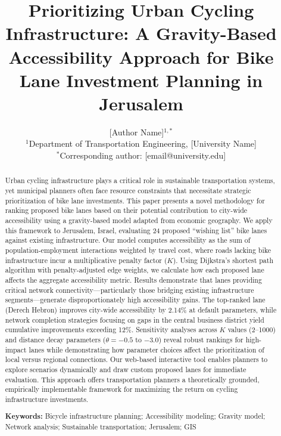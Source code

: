\documentclass[12pt,a4paper]{article}
\title{\textbf{Prioritizing Urban Cycling Infrastructure: A Gravity-Based Accessibility Approach for Bike Lane Investment Planning in Jerusalem}}
\author{
    [Author Name]$^{1,*}$ \\[0.5em]
    \small $^{1}$Department of Transportation Engineering, [University Name] \\
    \small $^{*}$Corresponding author: [email@university.edu]
}
\date{}
\begin{document}
\maketitle

\begin{abstract}
\noindent Urban cycling infrastructure plays a critical role in sustainable transportation systems, yet municipal planners often face resource constraints that necessitate strategic prioritization of bike lane investments. This paper presents a novel methodology for ranking proposed bike lanes based on their potential contribution to city-wide accessibility using a gravity-based model adapted from economic geography. We apply this framework to Jerusalem, Israel, evaluating 24 proposed ``wishing list'' bike lanes against existing infrastructure. Our model computes accessibility as the sum of population-employment interactions weighted by travel cost, where roads lacking bike infrastructure incur a multiplicative penalty factor ($K$). Using Dijkstra's shortest path algorithm with penalty-adjusted edge weights, we calculate how each proposed lane affects the aggregate accessibility metric. Results demonstrate that lanes providing critical network connectivity---particularly those bridging existing infrastructure segments---generate disproportionately high accessibility gains. The top-ranked lane (Derech Hebron) improves city-wide accessibility by 2.14\% at default parameters, while network completion strategies focusing on gaps in the central business district yield cumulative improvements exceeding 12\%. Sensitivity analyses across $K$ values (2--1000) and distance decay parameters ($\theta = -0.5$ to $-3.0$) reveal robust rankings for high-impact lanes while demonstrating how parameter choices affect the prioritization of local versus regional connections. Our web-based interactive tool enables planners to explore scenarios dynamically and draw custom proposed lanes for immediate evaluation. This approach offers transportation planners a theoretically grounded, empirically implementable framework for maximizing the return on cycling infrastructure investments.

\vspace{1em}
\noindent\textbf{Keywords:} Bicycle infrastructure planning; Accessibility modeling; Gravity model; Network analysis; Sustainable transportation; Jerusalem; GIS
\end{abstract}
\end{document}
